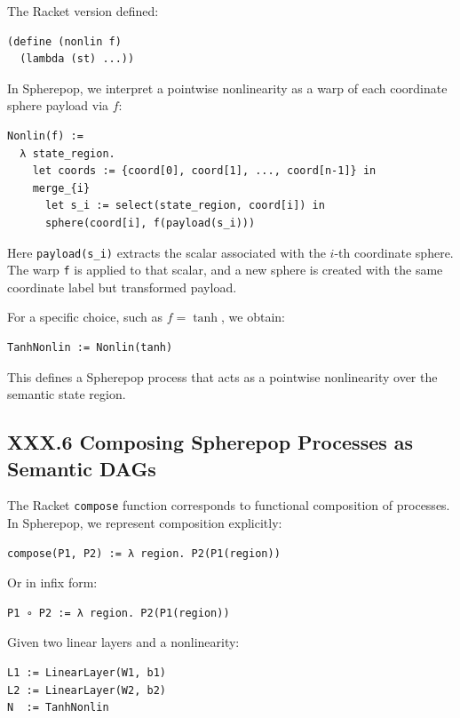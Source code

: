 \documentclass[12pt,letterpaper]{article}
\begin{document}
The Racket version defined:

\begin{verbatim}
(define (nonlin f)
  (lambda (st) ...))
\end{verbatim}

In Spherepop, we interpret a pointwise nonlinearity as a warp of each coordinate sphere payload via $f$:

\begin{verbatim}
Nonlin(f) :=
  λ state_region.
    let coords := {coord[0], coord[1], ..., coord[n-1]} in
    merge_{i}
      let s_i := select(state_region, coord[i]) in
      sphere(coord[i], f(payload(s_i)))
\end{verbatim}

Here \verb|payload(s_i)| extracts the scalar associated with the $i$-th coordinate sphere. The warp \verb|f| is applied to that scalar, and a new sphere is created with the same coordinate label but transformed payload.

For a specific choice, such as $f = \tanh$, we obtain:

\begin{verbatim}
TanhNonlin := Nonlin(tanh)
\end{verbatim}

This defines a Spherepop process that acts as a pointwise nonlinearity over the semantic state region.

\subsection{XXX.6 Composing Spherepop Processes as Semantic DAGs}

The Racket \verb|compose| function corresponds to functional composition of processes. In Spherepop, we represent composition explicitly:

\begin{verbatim}
compose(P1, P2) := λ region. P2(P1(region))
\end{verbatim}

Or in infix form:

\begin{verbatim}
P1 ∘ P2 := λ region. P2(P1(region))
\end{verbatim}

Given two linear layers and a nonlinearity:

\begin{verbatim}
L1 := LinearLayer(W1, b1)
L2 := LinearLayer(W2, b2)
N  := TanhNonlin
\end{verbatim}
\end{document}
